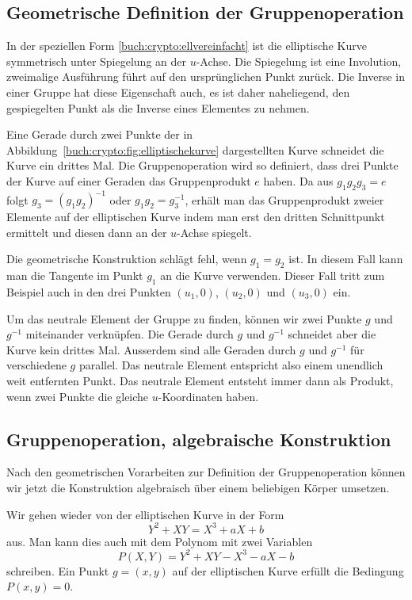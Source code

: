 \subsection{Geometrische Definition der Gruppenoperation}
In der speziellen Form \eqref{buch:crypto:ellvereinfacht} ist die
elliptische Kurve symmetrisch unter Spiegelung an der $u$-Achse.
Die Spiegelung ist eine Involution, zweimalige Ausführung führt auf
den ursprünglichen Punkt zurück.
Die Inverse in einer Gruppe hat diese Eigenschaft auch, es ist
daher naheliegend, den gespiegelten Punkt als die Inverse eines
Elementes zu nehmen.

Eine Gerade durch zwei Punkte der
in Abbildung~\ref{buch:crypto:fig:elliptischekurve}
dargestellten Kurve schneidet die Kurve ein drittes Mal.
Die Gruppenoperation wird so definiert, dass drei Punkte der Kurve
auf einer Geraden das Gruppenprodukt $e$ haben.
Da aus $g_1g_2g_3=e$ folgt $g_3=(g_1g_2)^{-1}$ oder
$g_1g_2=g_3^{-1}$, erhält man das Gruppenprodukt zweier Elemente
auf der elliptischen Kurve indem man erst den dritten Schnittpunkt
ermittelt und diesen dann an der $u$-Achse spiegelt.

Die geometrische Konstruktion schlägt fehl, wenn $g_1=g_2$ ist.
In diesem Fall kann man die Tangente im Punkt $g_1$ an die Kurve 
verwenden.
Dieser Fall tritt zum Beispiel auch in den drei Punkten 
$(u_1,0)$, $(u_2,0)$ und $(u_3,0)$ ein.

Um das neutrale Element der Gruppe zu finden, können wir 
zwei Punkte $g$ und $g^{-1}$ miteinander verknüpfen.
Die Gerade durch $g$ und $g^{-1}$ schneidet aber die Kurve
kein drittes Mal.
Ausserdem sind alle Geraden durch $g$ und $g^{-1}$ für verschiedene
$g$ parallel.
Das neutrale Element entspricht also einem unendlich weit entfernten Punkt.
Das neutrale Element entsteht immer dann als Produkt, wenn zwei
Punkte die gleiche $u$-Koordinaten haben.

\subsection{Gruppenoperation, algebraische Konstruktion}
Nach den geometrischen Vorarbeiten zur Definition der Gruppenoperation
können wir jetzt die Konstruktion algebraisch über einem 
beliebigen Körper umsetzen.

Wir gehen wieder von der elliptischen Kurve in der Form
\begin{equation}
Y^2+XY=X^3+aX+b
\label{buch:crypto:eqn:grupopgl}
\end{equation}
aus.
Man kann dies auch mit dem Polynom mit zwei Variablen
\[
P(X,Y) = Y^2+XY -X^3-aX-b
\]
schreiben.
Ein Punkt $g=(x,y)$ auf der elliptischen Kurve erfüllt die
Bedingung $P(x,y)=0$.

